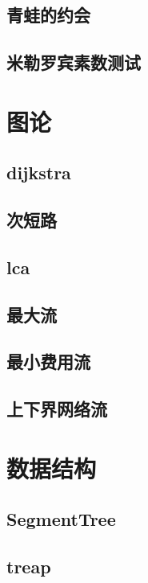 \documentclass[twocolumn,a4,twoside]{book}
\begin{document}
		\section{青蛙的约会}
		
		\section{米勒罗宾素数测试}
		
	
	\chapter{图论}
		\section{dijkstra}
		
		\section{次短路}
		
		\section{lca}
		
		\section{最大流}
		
		\section{最小费用流}
		
		\section{上下界网络流}
		
	
	\chapter{数据结构}
		\section{SegmentTree}
		
		\section{treap}
		
\end{document}
